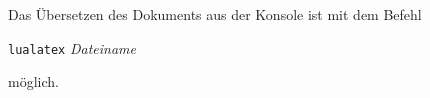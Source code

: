 \renewcommand*{\authorOfNextLines}{Helmut Quinz}
\label{par:UebersetzenKonsole}
Das Übersetzen des Dokuments aus der Konsole ist mit dem Befehl\\
\begin{center} \texttt{lualatex} \emph{Dateiname}\\ \end{center}
möglich.